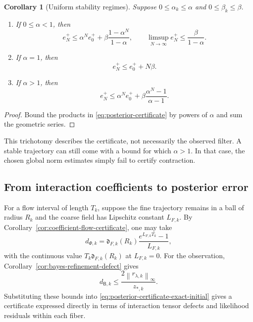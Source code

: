 \documentclass[11pt]{article}
\newtheorem{corollary}[theorem]{Corollary}
\theoremstyle{definition}
\theoremstyle{remark}
\newcommand{\norm}[1]{\left\lVert #1\right\rVert}
\newcommand{\Bup}{\mathsf B}
\begin{document}
\begin{corollary}[Uniform stability regimes]\label{cor:filter-stability-regimes}
Suppose $0\leq\alpha_k\leq\alpha$ and $0\leq\beta_k\leq\beta$.

\begin{enumerate}[label=(\roman*),leftmargin=2.8em]
\item If $0\leq\alpha<1$, then
\begin{equation}\label{eq:stable-filter-bound}
  e_N^+
  \leq
  \alpha^Ne_0^+
  +
  \beta\frac{1-\alpha^N}{1-\alpha},
  \qquad
  \limsup_{N\to\infty}e_N^+
  \leq\frac{\beta}{1-\alpha}.
\end{equation}

\item If $\alpha=1$, then
\[
  e_N^+\leq e_0^++N\beta.
\]

\item If $\alpha>1$, then
\[
  e_N^+
  \leq
  \alpha^Ne_0^+
  +
  \beta\frac{\alpha^N-1}{\alpha-1}.
\]
\end{enumerate}
\end{corollary}

\begin{proof}
Bound the products in \eqref{eq:posterior-certificate} by powers of $\alpha$ and sum the geometric series.
\end{proof}

This trichotomy describes the certificate, not necessarily the observed filter.  A stable trajectory can still come with a bound for which $\alpha>1$.  In that case, the chosen global norm estimates simply fail to certify contraction.

\subsection{From interaction coefficients to posterior error}
For a flow interval of length $T_k$, suppose the fine trajectory remains in a ball of radius $R_k$ and the coarse field has Lipschitz constant $L_{F,k}$.  By Corollary~\ref{cor:coefficient-flow-certificate}, one may take
\begin{equation}\label{eq:dphi-coefficient}
  d_{\Phi,k}
  =
  \mathfrak d_{F,k}(R_k)
  \frac{e^{L_{F,k}T_k}-1}{L_{F,k}},
\end{equation}
with the continuous value $T_k\mathfrak d_{F,k}(R_k)$ at $L_{F,k}=0$.
For the observation, Corollary~\ref{cor:bayes-refinement-defect} gives
\begin{equation}\label{eq:dbayes-coefficient}
  d_{\Bup,k}
  \leq
  \frac{2\norm{r_{\lambda,k}}_{\infty}}{z_{*,k}}.
\end{equation}
Substituting these bounds into \eqref{eq:posterior-certificate-exact-initial} gives a certificate expressed directly in terms of interaction tensor defects and likelihood residuals within each fiber.
\end{document}
